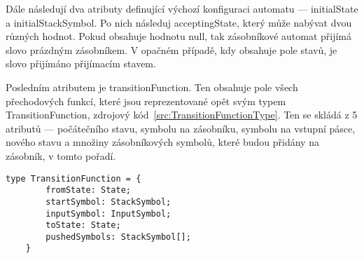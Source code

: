 Dále následují dva atributy definující výchozí konfiguraci automatu --- initialState a initialStackSymbol. Po nich následuj acceptingState, který může nabývat dvou různých hodnot. Pokud obsahuje hodnotu null, tak zásobníkové automat přijímá slovo prázdným zásobníkem. V opačném případě, kdy obsahuje pole stavů, je slovo přijímáno přijímacím stavem.

Posledním atributem je transitionFunction. Ten obsahuje pole všech přechodových funkcí, které jsou reprezentované opět svým typem TransitionFunction, zdrojový kód~\ref{src:TransitionFunctionType}. Ten se skládá z 5 atributů --- počátečního stavu, symbolu na zásobníku, symbolu na vstupní pásce, nového stavu a množiny zásobníkových symbolů, které budou přidány na zásobník, v tomto pořadí.

\begin{lstlisting}[label=src:TransitionFunctionType, caption={Datové typ TransitionFunction}]
    type TransitionFunction = {
        fromState: State;
        startSymbol: StackSymbol;
        inputSymbol: InputSymbol;
        toState: State;
        pushedSymbols: StackSymbol[];
    }
\end{lstlisting}


\endinput
